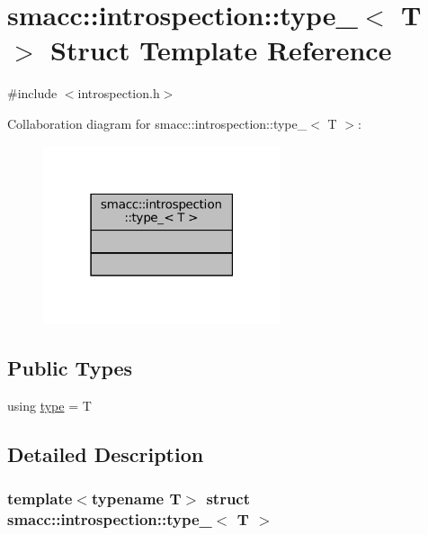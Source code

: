 \hypertarget{structsmacc_1_1introspection_1_1type__}{}\section{smacc\+:\+:introspection\+:\+:type\+\_\+$<$ T $>$ Struct Template Reference}
\label{structsmacc_1_1introspection_1_1type__}


{\ttfamily \#include $<$introspection.\+h$>$}



Collaboration diagram for smacc\+:\+:introspection\+:\+:type\+\_\+$<$ T $>$\+:
\nopagebreak
\begin{figure}[H]
\begin{center}
\leavevmode
\includegraphics[width=198pt]{structsmacc_1_1introspection_1_1type____coll__graph}
\end{center}
\end{figure}
\subsection*{Public Types}
\begin{DoxyCompactItemize}
\item 
using \hyperlink{structsmacc_1_1introspection_1_1type___afe9e4516cea9d3160f2eff1b787ca4f5}{type} = T
\end{DoxyCompactItemize}


\subsection{Detailed Description}
\subsubsection*{template$<$typename T$>$\newline
struct smacc\+::introspection\+::type\+\_\+$<$ T $>$}



